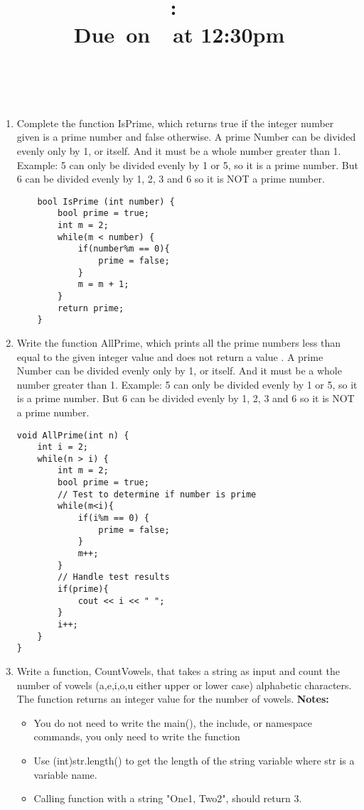 \documentclass{article}
\title{
    \vspace{2in}
    \textmd{\textbf{\hmwkClass:\ \hmwkTitle}}\\
    \normalsize\vspace{0.1in}\small{Due\ on\ \hmwkDueDate\ at 12:30pm}\\
    \vspace{0.1in}\large{\textit{\hmwkClassInstructor\ \hmwkClassTime}}
    \vspace{3in}
}
\author{\hmwkAuthorName}
\date{}
\begin{document}


\begin{enumerate}
	\item Complete the function IsPrime, which returns true if the integer number given is a prime number and false otherwise.  A prime Number can be divided evenly only by 1, or itself. And it must be a whole number greater than 1. Example: 5 can only be divided evenly by 1 or 5, so it is a prime number. But 6 can be divided evenly by 1, 2, 3 and 6 so it is NOT a prime number.

\begin{lstlisting}
	bool IsPrime (int number) {
	    bool prime = true;
	    int m = 2;
	    while(m < number) {
	        if(number%m == 0){
	            prime = false;
	        }
	        m = m + 1;
	    }
	    return prime;
	}
\end{lstlisting}
	
	\item Write the function AllPrime, which prints all the prime numbers less than equal to the given integer value and does not return a value .  A prime Number can be divided evenly only by 1, or itself. And it must be a whole number greater than 1. Example: 5 can only be divided evenly by 1 or 5, so it is a prime number. But 6 can be divided evenly by 1, 2, 3 and 6 so it is NOT a prime number.

\begin{lstlisting}
void AllPrime(int n) {
   	int i = 2;
    while(n > i) {
        int m = 2;
        bool prime = true;
        // Test to determine if number is prime
        while(m<i){
            if(i%m == 0) {
                prime = false;
            }
            m++;
        }
        // Handle test results
        if(prime){
            cout << i << " ";
        }
        i++;
    }
}
\end{lstlisting}

	\item Write a function, CountVowels, that takes a string as input and count the number of vowels (a,e,i,o,u either upper or lower case) alphabetic characters. The function returns an integer value for the number of vowels.
	\newline \textbf{Notes:}
	\begin{itemize}
		\item You do not need to write the main(), the include, or namespace commands, you only need to write the function
		\item Use (int)str.length() to get the length of the string variable where str is a variable name.
		\item Calling function with a string "One1, Two2", should return 3.
	\end{itemize}


\end{enumerate}
\end{document}
